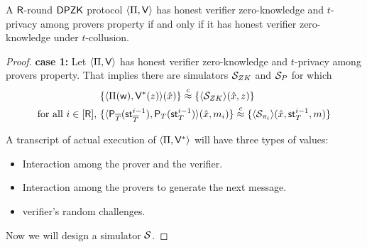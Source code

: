 \begin{theorem}\label{theo:equivalent}
	A $\mathsf{R}$-round $\mathsf{DPZK}$ protocol $\langle \Pi,\mathsf{V}\rangle$ has honest verifier zero-knowledge and $t$-privacy among provers property if and only if it has honest verifier zero-knowledge under $t$-collusion.
\end{theorem}

\begin{proof}
	\textbf{case 1:} Let $\langle \Pi,\mathsf{V}\rangle$ has honest verifier zero-knowledge and $t$-privacy among provers property. That implies there are simulators $\mathcal{S}_{ZK}$ and $\mathcal{S}_{P}$ for which 
	\begin{align}
	&\{ \langle  \Pi( \mathsf{w} ) , \mathsf{V}^*( z ) \rangle ( \hat{x}) \} \stackrel{c}{\approx} \{ \langle \mathcal{S}_{ZK} \rangle(\hat{x}, z) \}\\        
	\text{for all }i \in [\mathsf{R}] \text{, } &\{ \langle  \mathsf{P}_{\overline{T}}( \mathsf{st}^{i-1}_{\overline{T}} ) , \mathsf{P}_T ( \mathsf{st}^{i-1}_T ) \rangle ( \hat{x}  , m_i) \}
	\stackrel{c}{\approx} \{ \langle \mathcal{S}_{\pi_i} \rangle (\hat{x}, \mathsf{st}^{i-1}_T, m) \}
	\end{align}

	A transcript of actual execution of $\langle \Pi,\mathsf{V}^*\rangle$ will have three types of values:
	
	\begin{itemize}
		\item Interaction among the prover and the verifier.
		\item Interaction among the provers to generate the next message.
		\item verifier's random challenges.         
	\end{itemize}
	Now we will design a simulator $\mathcal{S}$.
	

\end{proof}
